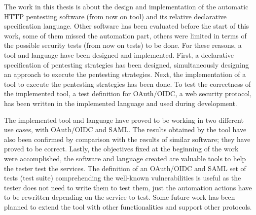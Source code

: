 The work in this thesis is about the design and implementation of the automatic HTTP pentesting software (from now on tool) and its relative declarative specification language. Other software has been evaluated before the start of this work, some of them missed the automation part, others were limited in terms of the possible security tests (from now on tests) to be done. For these reasons, a tool and language have been designed and implemented. First, a declarative specification of pentesting strategies has been designed, simultaneously designing an approach to execute the pentesting strategies. Next, the implementation of a tool to execute the pentesting strategies has been done. To test the correctness of the implemented tool, a test definition for \gls{OAuth}/OIDC, a web security protocol, has been written in the implemented language and used during development.

The implemented tool and language have proved to be working in two different use cases, with OAuth/OIDC and SAML. The results obtained by the tool have also been confirmed by comparison with the results of similar software; they have proved to be correct. Lastly, the objectives fixed at the beginning of the work were accomplished, the software and language created are valuable tools to help the tester test the services. The definition of an OAuth/OIDC and SAML set of tests (test suite) comprehending the well-known vulnerabilities is useful as the tester does not need to write them to test them, just the automation actions have to be rewritten depending on the service to test. Some future work has been planned to extend the tool with other functionalities and support other protocols.






